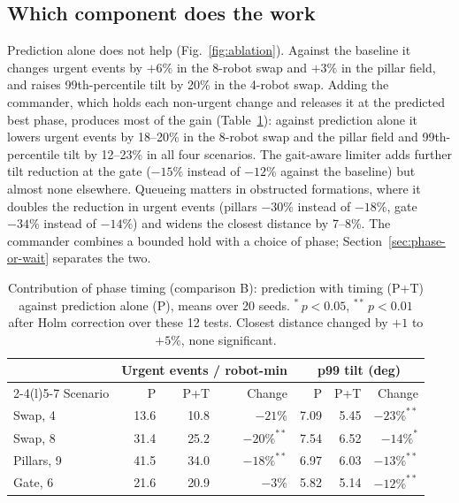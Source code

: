 \documentclass[pdflatex,sn-mathphys-num]{sn-jnl}
\begin{document}
\subsection{Which component does the work}\label{sec:which}
Prediction alone does not help (Fig.~\ref{fig:ablation}). Against the baseline it changes urgent events by
$+6\%$ in the 8-robot swap and $+3\%$ in the pillar field, and raises 99th-percentile tilt by 20\% in the
4-robot swap. Adding the commander, which holds each non-urgent change and releases it at the predicted best
phase, produces most of the gain (Table~\ref{tab:timing}): against prediction alone it lowers urgent events
by 18--20\% in the 8-robot swap and the pillar field and 99th-percentile tilt by 12--23\% in all four
scenarios. The gait-aware limiter adds further tilt reduction at the gate ($-15\%$ instead of $-12\%$ against
the baseline) but almost none elsewhere. Queueing matters in obstructed formations, where it doubles the
reduction in urgent events (pillars $-30\%$ instead of $-18\%$, gate $-34\%$ instead of $-14\%$) and widens
the closest distance by 7--8\%. The commander combines a bounded hold with a choice of phase;
Section~\ref{sec:phase-or-wait} separates the two.

\begin{table}[t]
  \centering
  \caption{Contribution of phase timing (comparison B): prediction with timing (P+T) against prediction
  alone (P), means over 20 seeds. $^{*}$\,$p<0.05$, $^{**}$\,$p<0.01$ after Holm correction over these 12
  tests. Closest distance changed by $+1$ to $+5\%$, none significant.}
  \label{tab:timing}
  \small
  \begin{tabular}{@{}l rrr rrr@{}}
    \toprule
    & \multicolumn{3}{c}{Urgent events / robot-min} & \multicolumn{3}{c}{p99 tilt (deg)} \\
    \cmidrule(lr){2-4}\cmidrule(l){5-7}
    Scenario & P & P+T & Change & P & P+T & Change \\
    \midrule
    Swap, 4    & 13.6 & 10.8 & $-21\%$ & 7.09 & 5.45 & $-23\%^{**}$ \\
    Swap, 8    & 31.4 & 25.2 & $-20\%^{**}$ & 7.54 & 6.52 & $-14\%^{*}$ \\
    Pillars, 9 & 41.5 & 34.0 & $-18\%^{**}$ & 6.97 & 6.03 & $-13\%^{**}$ \\
    Gate, 6    & 21.6 & 20.9 & $-3\%$ & 5.82 & 5.14 & $-12\%^{**}$ \\
    \bottomrule
  \end{tabular}
\end{table}
\end{document}
